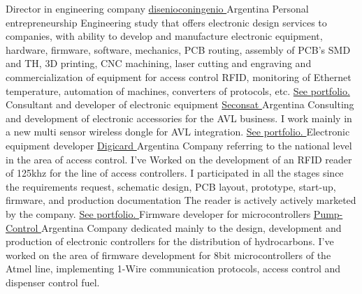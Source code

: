       {Director in engineering company                    }{\href{ www.disenioconingenio.com.ar }{ disenioconingenio }  }{Argentina                   }{}{ Personal entrepreneurship Engineering study that offers electronic design services to companies, with ability to develop and manufacture electronic equipment, hardware, firmware, software, mechanics, PCB routing, assembly of PCB's SMD and TH, 3D printing, CNC machining, laser cutting and engraving and commercialization of equipment for access control RFID, monitoring of Ethernet temperature, automation of machines, converters of protocols, etc. \hyperlink {subsec:dci}{ See portfolio. } }
      {Consultant and developer of electronic equipment   }{\href{ www.seconsat.com             }{ Seconsat          }  }{Argentina                   }{}{ Consulting and development of electronic accessories for the AVL business. I work mainly in a new multi sensor wireless dongle for AVL integration. \hyperlink                                                                                                                                                                                                                                                                                                              {subsec:seconsat}{ See portfolio. } }
      {Electronic equipment developer                     }{\href{ www.digicard.com.ar          }{ Digicard          }  }{Argentina                   }{}{ Company referring to the national level in the area of access control. I've Worked on the development of an RFID reader of 125khz for the line of access controllers. I participated in all the stages since the requirements request, schematic design, PCB layout, prototype, start-up, firmware, and production documentation The reader is actively actively marketed by the company. \hyperlink                                                                      {subsec:digicard}{ See portfolio. } }
      {Firmware developer for microcontrollers            }{\href{ www.pump-control.com.ar      }{ Pump-Control      }  }{Argentina                   }{}{ Company dedicated mainly to the design, development and production of electronic controllers for the distribution of hydrocarbons. I've worked on the area of firmware development for 8bit microcontrollers of the Atmel line, implementing 1-Wire communication protocols, access control and dispenser control fuel.                                                                                                                                                                     }
   \vfill{}

